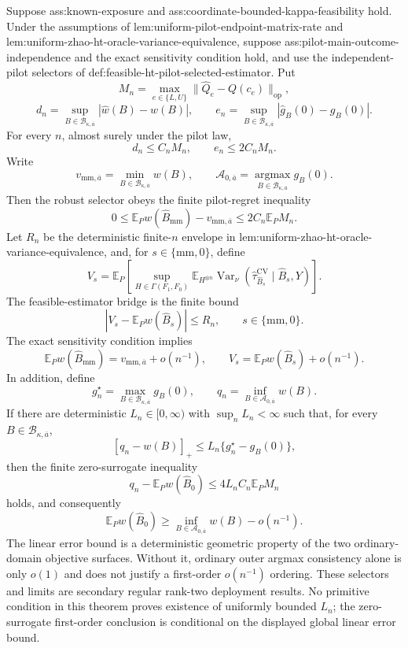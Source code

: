 Suppose ass:known-exposure and ass:coordinate-bounded-kappa-feasibility hold.  Under the assumptions of lem:uniform-pilot-endpoint-matrix-rate and lem:uniform-zhao-ht-oracle-variance-equivalence, suppose ass:pilot-main-outcome-independence and the exact sensitivity condition hold, and use the independent-pilot selectors of def:feasible-ht-pilot-selected-estimator.  Put
\[
M_n=\max_{e\in\{L,U\}}\lVert\widehat Q_e-Q(c_e)\rVert_{\mathrm{op}},
\]
\[
d_n=\sup_{B\in\mathcal B_{\kappa,\overline a}}|\widehat w(B)-w(B)|,
\qquad
e_n=\sup_{B\in\mathcal B_{\kappa,\overline a}}|\widehat g_B(0)-g_B(0)|.
\]
For every \(n\), almost surely under the pilot law,
\[
d_n\le C_nM_n,
\qquad e_n\le2C_nM_n.
\]
Write
\[
v_{\mathrm{mm},\overline a}=\min_{B\in\mathcal B_{\kappa,\overline a}}w(B),
\qquad
\mathcal A_{0,\overline a}=\operatorname*{argmax}_{B\in\mathcal B_{\kappa,\overline a}}g_B(0).
\]
Then the robust selector obeys the finite pilot-regret inequality
\[
0\le
\mathbb E_Pw(\widehat B_{\mathrm{mm}})-v_{\mathrm{mm},\overline a}
\le2C_n\mathbb E_PM_n.
\]
Let \(R_n\) be the deterministic finite-\(n\) envelope in lem:uniform-zhao-ht-oracle-variance-equivalence, and, for \(s\in\{\mathrm{mm},0\}\), define
\[
V_s=
\mathbb E_P\left[
\sup_{H\in\Gamma(F_1,F_0)}
\mathbb E_{H^{\otimes n}}
\operatorname{Var}_\nu
(\widehat\tau_{\widehat B_s}^{\mathrm{CV}}\mid\widehat B_s,Y)
\right].
\]
The feasible-estimator bridge is the finite bound
\[
|V_s-\mathbb E_Pw(\widehat B_s)|\le R_n,
\qquad s\in\{\mathrm{mm},0\}.
\]
The exact sensitivity condition implies
\[
\mathbb E_Pw(\widehat B_{\mathrm{mm}})
=v_{\mathrm{mm},\overline a}+o(n^{-1}),
\qquad
V_s=\mathbb E_Pw(\widehat B_s)+o(n^{-1}).
\]
In addition, define
\[
g_n^\star=\max_{B\in\mathcal B_{\kappa,\overline a}}g_B(0),
\qquad
q_n=\inf_{B\in\mathcal A_{0,\overline a}}w(B).
\]
If there are deterministic \(L_n\in[0,\infty)\) with \(\sup_nL_n<\infty\) such that, for every \(B\in\mathcal B_{\kappa,\overline a}\),
\[
[q_n-w(B)]_+\le L_n\{g_n^\star-g_B(0)\},
\]
then the finite zero-surrogate inequality
\[
q_n-\mathbb E_Pw(\widehat B_0)
\le4L_nC_n\mathbb E_PM_n
\]
holds, and consequently
\[
\mathbb E_Pw(\widehat B_0)
\ge\inf_{B\in\mathcal A_{0,\overline a}}w(B)-o(n^{-1}).
\]
The linear error bound is a deterministic geometric property of the two ordinary-domain objective surfaces.  Without it, ordinary outer argmax consistency alone is only \(o(1)\) and does not justify a first-order \(o(n^{-1})\) ordering.  These selectors and limits are secondary regular rank-two deployment results.  No primitive condition in this theorem proves existence of uniformly bounded \(L_n\); the zero-surrogate first-order conclusion is conditional on the displayed global linear error bound.